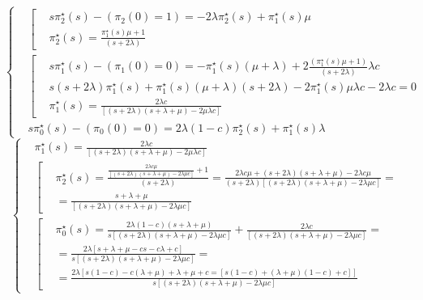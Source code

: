 \[
	\left\{
	\begin{aligned}
	&\left[
	\begin{aligned}
	&s\pi_2^\star(s) -(\pi_2(0)=1) = -2\lambda\pi_2^\star(s) + \pi_1^\star(s)\mu\\
	&\pi_2^\star(s) = \frac{\pi_1^\star(s)\mu + 1}{(s+2\lambda)}
	\end{aligned}
	\right.\\
	&\left[
	\begin{aligned}
	&s\pi_1^\star(s) -(\pi_1(0)=0) = -\pi_1^\star(s)(\mu+\lambda) + 2\frac{(\pi_1^\star(s)\mu +1)}{(s+2\lambda)}\lambda c\\
	&s(s+2\lambda)\pi_1^\star(s) + \pi_1^\star(s)(\mu+\lambda)(s+2\lambda) - 2\pi_1^\star(s)\mu\lambda c - 2\lambda c = 0\\
	&\pi_1^\star(s) = \frac{2\lambda c}{[(s+2\lambda)(s+\lambda+\mu)-2\mu\lambda c]}
	\end{aligned}
	\right.\\
	&s\pi_0^\star(s) -(\pi_0(0) = 0) = 2\lambda(1-c)\pi_2^\star(s) + \pi_1^\star(s)\lambda
	\end{aligned}
	\right.
\]
\[
	\left\{
	\begin{aligned}
	&\pi_1^\star(s) = \frac{2\lambda c}{[(s+2\lambda)(s+\lambda+\mu)-2\mu\lambda c]}\\
	&\left[
	\begin{aligned}
	&\pi_2^\star(s) = \frac{\frac{2\lambda c\mu}{[(s+2\lambda)(s+\lambda+\mu)-2\lambda\mu c]} + 1}{(s+2\lambda)} = \frac{2\lambda c\mu + (s+2\lambda)(s+\lambda+\mu) - 2\lambda c\mu}{(s+2\lambda)[(s+2\lambda)(s+\lambda+\mu) - 2\lambda\mu c]} =\\
	&= \frac{s+\lambda+\mu}{[(s+2\lambda)(s+\lambda+\mu) - 2\lambda\mu c]}
	\end{aligned}
	\right.\\
	&\left[
	\begin{aligned}
	&\pi_0^\star(s) = \frac{2\lambda(1-c)(s+\lambda+\mu)}{s[(s+2\lambda)(s+\lambda+\mu) - 2\lambda\mu c]} + \frac{2\lambda c}{[(s+2\lambda)(s+\lambda+\mu) - 2\lambda\mu c]} =\\
	&= \frac{2\lambda[s+\lambda+\mu - cs - c\lambda + c]}{s[(s+2\lambda)(s+\lambda+\mu) - 2\lambda\mu c]} =\\
	& = \frac{2\lambda[s(1-c) - c(\lambda+\mu) + \lambda+\mu + c = [s(1-c)+(\lambda+\mu)(1-c) +c]]}{s[(s+2\lambda)(s+\lambda+\mu) - 2\lambda\mu c]}
	\end{aligned}
	\right.
	\end{aligned}
	\right.
\]

